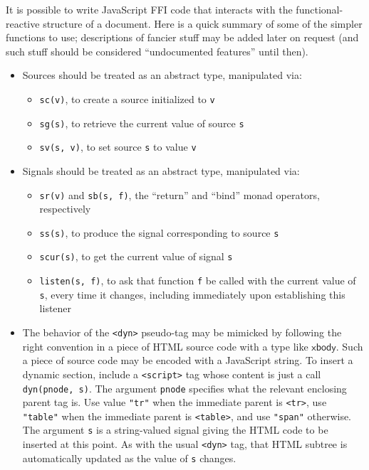 \documentclass{article}
\newcommand{\cd}[1]{\texttt{#1}}
\newcommand{\mt}[1]{\mathsf{#1}}
\begin{document}
It is possible to write JavaScript FFI code that interacts with the functional-reactive structure of a document.  Here is a quick summary of some of the simpler functions to use; descriptions of fancier stuff may be added later on request (and such stuff should be considered ``undocumented features'' until then).

\begin{itemize}
\item Sources should be treated as an abstract type, manipulated via:
  \begin{itemize}
  \item \cd{sc(v)}, to create a source initialized to \cd{v}
  \item \cd{sg(s)}, to retrieve the current value of source \cd{s}
  \item \cd{sv(s, v)}, to set source \cd{s} to value \cd{v}
  \end{itemize}

\item Signals should be treated as an abstract type, manipulated via:
  \begin{itemize}
  \item \cd{sr(v)} and \cd{sb(s, f)}, the ``return'' and ``bind'' monad operators, respectively
  \item \cd{ss(s)}, to produce the signal corresponding to source \cd{s}
  \item \cd{scur(s)}, to get the current value of signal \cd{s}
  \item \cd{listen(s, f)}, to ask that function \cd{f} be called with the current value of \cd{s}, every time it changes, including immediately upon establishing this listener
  \end{itemize}

\item The behavior of the \cd{<dyn>} pseudo-tag may be mimicked by following the right convention in a piece of HTML source code with a type like $\mt{xbody}$.  Such a piece of source code may be encoded with a JavaScript string.  To insert a dynamic section, include a \cd{<script>} tag whose content is just a call \cd{dyn(pnode, s)}.  The argument \cd{pnode} specifies what the relevant enclosing parent tag is.  Use value \cd{"tr"} when the immediate parent is \cd{<tr>}, use \cd{"table"} when the immediate parent is \cd{<table>}, and use \cd{"span"} otherwise.  The argument \cd{s} is a string-valued signal giving the HTML code to be inserted at this point.  As with the usual \cd{<dyn>} tag, that HTML subtree is automatically updated as the value of \cd{s} changes.


\end{itemize}
\end{document}
